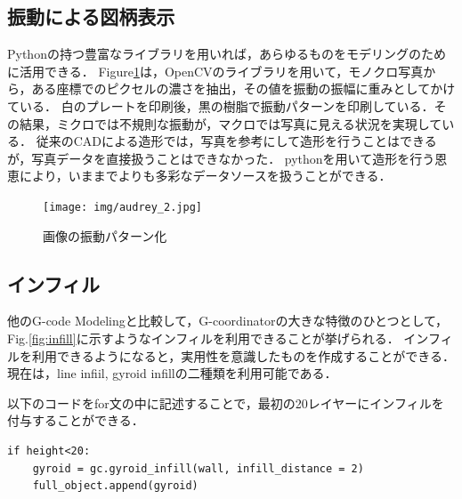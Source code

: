\documentclass{article}
\begin{document}
\begin{twocolumn}
\begin{itemize}
\subsection{振動による図柄表示}
Pythonの持つ豊富なライブラリを用いれば，あらゆるものをモデリングのために活用できる．
Figure\ref{fig:audrey}は，OpenCVのライブラリを用いて，モノクロ写真から，ある座標でのピクセルの濃さを抽出，その値を振動の振幅に重みとしてかけている．
白のプレートを印刷後，黒の樹脂で振動パターンを印刷している．その結果，ミクロでは不規則な振動が，マクロでは写真に見える状況を実現している．
従来のCADによる造形では，写真を参考にして造形を行うことはできるが，写真データを直接扱うことはできなかった．
pythonを用いて造形を行う恩恵により，いままでよりも多彩なデータソースを扱うことができる．
\begin{figure}[htbp]
  \texttt{[image: img/audrey\_2.jpg]}
  \caption{画像の振動パターン化}
  \label{fig:audrey}
\end{figure}

\subsection{インフィル}
他のG-code Modelingと比較して，G-coordinatorの大きな特徴のひとつとして，Fig.\ref{fig:infill}に示すようなインフィルを利用できることが挙げられる．
インフィルを利用できるようになると，実用性を意識したものを作成することができる．
現在は，line infiil, gyroid infillの二種類を利用可能である．

以下のコードをfor文の中に記述することで，最初の20レイヤーにインフィルを付与することができる．
\begin{lstlisting}
if height<20:
    gyroid = gc.gyroid_infill(wall, infill_distance = 2)
    full_object.append(gyroid)
\end{lstlisting}


\end{itemize}
\end{twocolumn}
\end{document}
